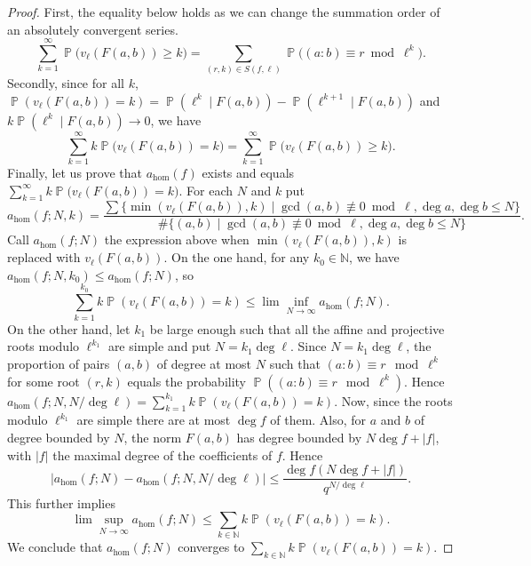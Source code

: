 \documentclass[a4wide]{article}
\newcommand{\N}{{\mathbb N}}
\DeclareMathOperator{\Prob}{\mathbb{P}}
\theoremstyle{plain}
\theoremstyle{definition}
\theoremstyle{remark}
\begin{document}
\begin{proof}
	First, the equality below holds as we can change the summation order of
	an absolutely convergent series. \
	\begin{equation*}
\sum_{k=1}^\infty\Prob\bigg(v_\ell(F(a,b))\geq k\bigg)=\sum_{(r,k)\in
	S(f,\ell)}\Prob\bigg ((a:b)\equiv r\bmod \ell^k\bigg).
\end{equation*}
Secondly, since for all $k$, $\Prob(v_\ell(F(a,b))=k)=\Prob(\ell^k\mid
F(a,b))-\Prob(\ell^{k+1}\mid F(a,b))$ and $k\Prob(\ell^k\mid
F(a,b))\rightarrow 0$, we have 
\begin{equation*}
\sum_{k=1}^\infty k\Prob\bigg(v_\ell(F(a,b))=k\bigg)
	=\sum_{k=1}^\infty\Prob\bigg(v_\ell(F(a,b))\geq k\bigg).
\end{equation*}
Finally, let us prove that $a_\text{hom}(f)$ exists and equals $\sum_{k=1}^\infty
k\Prob\big(v_\ell (F(a,b))=k\big)$. For each $N$ and $k$ put
\begin{equation*}
a_\text{hom}(f;N,k)=\frac{\sum\{\min(v_\ell (F(a,b)),k) \mid
\gcd(a,b)\not \equiv0 \bmod \ell, \deg a,\deg b\leq N\}}{\# \{(a,b)\mid 
\gcd(a,b)\not\equiv 0\bmod \ell, \deg a,\deg b\leq N\}   }.
\end{equation*}
Call $a_\text{hom}(f;N)$ the expression above when $\min(v_\ell (F(a,b)),k)$
is replaced with $v_\ell (F(a,b))$.
On the one hand, for any $k_0\in \N$, we have $a_\text{hom}(f;N,k_0)\leq
a_\text{hom}(f;N)$, so
\begin{equation*}
	\sum_{k=1}^{k_0}k\Prob(v_\ell (F(a,b))=k)\leq
	\lim\inf_{N\rightarrow\infty}a_\text{hom}(f;N).
\end{equation*}
On the other hand, let $k_1$ be large enough
such that all the affine and projective roots modulo $\ell^{k_1}$ are simple
and put $N=k_1\deg \ell$. Since $N=k_1\deg \ell$, the proportion of pairs
$(a,b)$ of degree at most $N$ such that $(a:b)\equiv r\mod \ell^k$ for some root
$(r,k)$ equals the probability $\Prob((a:b)\equiv r\mod \ell^k)$. Hence 
$a_\text{hom}(f;N,N/\deg\ell)=\sum_{k=1}^{k_1}k\Prob(v_\ell(F(a,b))=k)$.
Now, since the roots modulo $\ell^{k_1}$ are simple there are at most $\deg
f$ of them. Also, for $a$ and $b$ of degree bounded by $N$, the norm
$F(a,b)$ has degree bounded by $N\deg f+|f|$, with $|f|$ the maximal degree of the coefficients of $f$. Hence
\begin{equation*}
	|a_\text{hom}(f;N)-a_\text{hom}(f;N,N/\deg \ell)|\leq \frac{\deg f (N \deg
	f+|f|)}{q^{N/\deg \ell}}.
\end{equation*}
This further implies 
\begin{equation*}
\lim\sup_{N\rightarrow\infty}a_\text{hom}(f;N)\leq\sum_{k\in\N}k\Prob(v_\ell( F(a,b))=k).
\end{equation*}
We conclude that $a_\text{hom}(f;N)$ converges to $\sum_{k\in\N}k\Prob(v_\ell(
F(a,b))=k)$. 
\end{proof}
\end{document}
